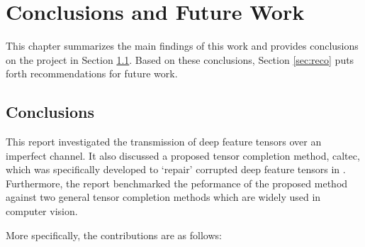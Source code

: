 \chapter{Conclusions and Future Work} \label{chapter:conclusions}

This chapter summarizes the main findings of this work and provides conclusions on the project in Section \ref{sec:conclu}. Based on these conclusions, Section \ref{sec:reco} puts forth recommendations for future work.

\section{Conclusions} \label{sec:conclu}

This report investigated the transmission of deep feature tensors over an imperfect channel. It also discussed a proposed tensor completion method, \gls{caltec}, which was specifically developed to `repair' corrupted deep feature tensors in . Furthermore, the report benchmarked the peformance of the proposed method against two general tensor completion methods which are widely used in computer vision.

More specifically, the contributions are as follows:

